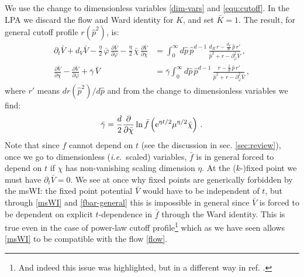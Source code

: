\documentclass[11pt]{book} %
\newcommand\ie{\textit{i.e.}\ }
\newcommand{\bc}{\bar \chi}
\newcommand{\bV}{\bar V}
\newcommand{\be}{\begin{equation}}
\newcommand{\ee}{\end{equation}}
\begin{document}
We use the change to dimensionless variables \eqref{dim-vars} and \eqref{equ:cutoff}. In the LPA we discard the flow and Ward identity for $K$, and set $\bar K=1$. The result, for general cutoff profile $r(\hat{p}^2)$, is:
\begin{align}
\label{flow}
\partial_t \bar V + d_V \bar V - \frac{\eta}{2} \, \bar\varphi \, \frac{\partial \bar V}{\partial \bar\varphi} - \frac{\eta}{2} \, \bar\chi \, \frac{\partial \bar V}{\partial \bar\chi} &=
\int_0^{\infty} d\hat p \, \hat p^{d-1} \, \frac{d_R\, r - \frac{d_V}{d} \, \hat p \, r'}{\hat p^2 + r - \partial^2_{\bar\varphi}\bar V}\,,\\
\label{msWI}
\frac{\partial \bar V}{\partial \bar\chi} - \frac{\partial \bar V}{\partial \bar\varphi} + \bar \gamma \, \bar V &= \bar \gamma
\int_0^{\infty} d\hat p \, \hat p^{d-1} \, \frac{r - \frac{1}{d} \, \hat p \, r'}{\hat p^2 + r - \partial^2_{\bar\varphi}\bar V} \,,
\end{align}
where $r'$ means $dr(\hat{p}^2)/d\hat{p}$ and from the change to dimensionless variables we find:
\be
\label{fbar-general}
\bar{\gamma} = \frac{d}{2}\frac{\partial}{\partial\bc}\ln\bar{f}\left({\rm e}^{\eta t/2}\mu^{\eta/2}\bc\right)\,.
\ee
Note that since $f$ cannot depend on $t$ (see the discussion in sec. \ref{sec:review}), once we go to dimensionless (\ie scaled) variables, $\bar{f}$ is in general forced to depend on $t$ if $\chi$ has non-vanishing scaling dimension $\eta$.
At the ($k$-)fixed point we must have $\partial_t \bar V = 0$. We see at once why fixed points are generically forbidden by the msWI: the fixed point potential $\bar{V}$ would have to be independent of $t$, but through \eqref{msWI} and \eqref{fbar-general} this is impossible in general since $\bV$ is forced to be dependent on explicit $t$-dependence in $\bar{f}$ through the Ward identity. This is true even in the case of power-law cutoff profile\footnote{And indeed this issue was highlighted, but in a different way in ref. \cite{Dietz:2015owa}.} which as we have seen allows \eqref{msWI} to be compatible with the flow \eqref{flow}.
\end{document}
